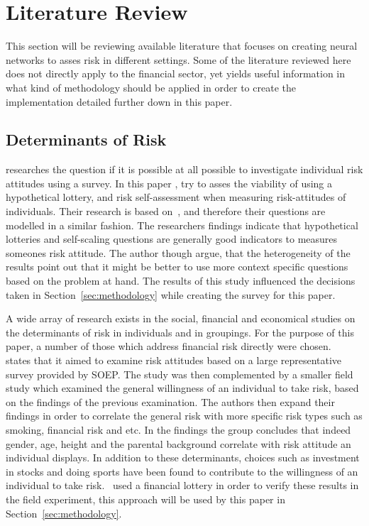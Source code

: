 \documentclass{article}
\begin{document}
\section{Literature Review}
\label{sec:literature_review}
This section will be reviewing available literature that focuses on creating neural networks to asses risk in different settings. Some of the literature reviewed here does not directly apply to the financial sector, yet yields useful information in what kind of methodology should be applied in order to create the implementation detailed further down in this paper.

\subsection{Determinants of Risk}
\label{sub:determinants_riks}

\cite{dp4807.pdf} researches the question if it is possible at all possible to investigate individual risk attitudes using a survey. In this paper \citep{dp4807.pdf}, try to asses the viability of using a hypothetical lottery, and risk self-assessment when measuring risk-attitudes of individuals. Their research is based on~\cite{individualRiskAttitudes}, and therefore their questions are modelled in a similar fashion. The researchers findings indicate that hypothetical lotteries and self-scaling questions are generally good indicators to measures someones risk attitude. The author though argue, that the heterogeneity of the results point out that it might be better to use more context specific questions based on the problem at hand. The results of this study influenced the decisions taken in Section~\ref{sec:methodology} while creating the survey for this paper.

A wide array of research exists in the social, financial and economical studies on the determinants of risk in individuals and in groupings. For the purpose of this paper, a number of those which address financial risk directly were chosen.~\cite{individualRiskAttitudes} states that it aimed to examine risk attitudes based on a large representative survey provided by SOEP\@. The study was then complemented by a smaller field study which examined the general willingness of an individual to take risk, based on the findings of the previous examination. The authors then expand their findings in order to correlate the general risk with more specific risk types such as smoking, financial risk and etc. In the findings the group concludes that indeed gender, age, height and the parental background correlate with risk attitude an individual displays. In addition to these determinants, choices such as investment in stocks and doing sports have been found to contribute to the willingness of an individual to take risk.~\cite{individualRiskAttitudes} used a financial lottery in order to verify these results in the field experiment, this approach will be used by this paper in Section~\ref{sec:methodology}.
\end{document}
